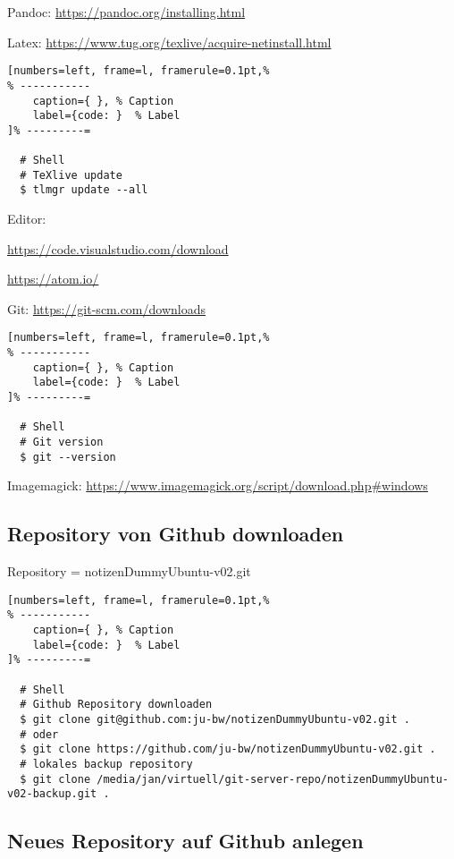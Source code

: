 Pandoc: \url{https://pandoc.org/installing.html}

Latex: \url{https://www.tug.org/texlive/acquire-netinstall.html}

\lstset{language=Bash} %
\begin{lstlisting}[numbers=left, frame=l, framerule=0.1pt,%
% -----------
	caption={ }, % Caption
	label={code: }  % Label
]% ---------=

  # Shell
  # TeXlive update
  $ tlmgr update --all
\end{lstlisting}

Editor:

\url{https://code.visualstudio.com/download}

\url{https://atom.io/}

Git: \url{https://git-scm.com/downloads}

\lstset{language=Bash} %
\begin{lstlisting}[numbers=left, frame=l, framerule=0.1pt,%
% -----------
	caption={ }, % Caption
	label={code: }  % Label
]% ---------=

  # Shell
  # Git version
  $ git --version
\end{lstlisting}

Imagemagick:
\url{https://www.imagemagick.org/script/download.php\#windows}

\subsection{Repository von Github
downloaden}\label{repository-von-github-downloaden}

Repository = notizenDummyUbuntu-v02.git

\lstset{language=Bash} %
\begin{lstlisting}[numbers=left, frame=l, framerule=0.1pt,%
% -----------
	caption={ }, % Caption
	label={code: }  % Label
]% ---------=

  # Shell
  # Github Repository downloaden
  $ git clone git@github.com:ju-bw/notizenDummyUbuntu-v02.git .
  # oder
  $ git clone https://github.com/ju-bw/notizenDummyUbuntu-v02.git .
  # lokales backup repository
  $ git clone /media/jan/virtuell/git-server-repo/notizenDummyUbuntu-v02-backup.git .
\end{lstlisting}

\subsection{Neues Repository auf Github
anlegen}\label{neues-repository-auf-github-anlegen}

